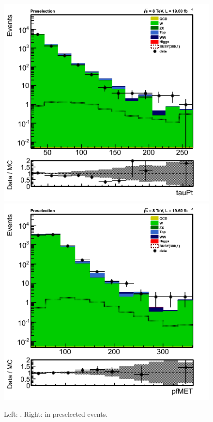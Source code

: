 \begin{figure}[!Hhtb]
\centering
\includegraphics[angle=0,scale=0.375]{SelectionMuTau/tauPt_muTau.png}
\includegraphics[angle=0,scale=0.375]{SelectionMuTau/pfMET_muTau.png}
\caption{Left: \Tau\PT. Right: \MPT in preselected \muTau events.}
\label{fig:datamcmuotau}
\end{figure}

